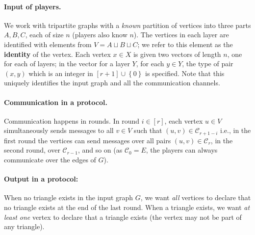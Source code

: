 \documentclass[11pt]{article}
\theoremstyle{definition}
\newcommand{\set}[1]{\ensuremath{\left\{ #1 \right\}}}
\newcommand{\cC}{\ensuremath{\mathcal{C}}}
\begin{document}
\paragraph{Input of players.} We work with tripartite graphs with a \emph{known} partition of vertices into three parts $A,B,C$, each of size $n$ (players also know $n$). The vertices in each layer 
are identified with elements from $V = A \sqcup B \sqcup C$; we refer to this element as the \textbf{identity} of the vertex. 
Each vertex $x \in X$ is given two vectors of length $n$, one for each of layers; in the vector for a layer $Y$, for each $y \in Y$, the type of pair $(x,y)$ which is an integer in $[r+1] \cup \set{0}$ is specified. 
Note that this uniquely identifies the input graph and all the communication channels. 

\paragraph{Communication in a protocol.} Communication happens in rounds. In round $i \in [r]$, each vertex $u \in V$ simultaneously sends messages to all $v \in V$ such that $(u,v) \in \cC_{r+1-i}$
 i.e., in the first round the vertices can send messages over all pairs $(u,v) \in \cC_r$, in the second round, over $\cC_{r-1}$, and so on (as $\cC_0 = E$, the players
 can always communicate over the edges of $G$). 

\paragraph{Output in a protocol:} %
When no triangle exists in the input graph $G$, we want \emph{all} vertices to declare that no triangle exists at the end of the last round. When a triangle exists, we want \emph{at least one} vertex to declare that a triangle exists 
(the vertex may not be part of any triangle). 
\end{document}
